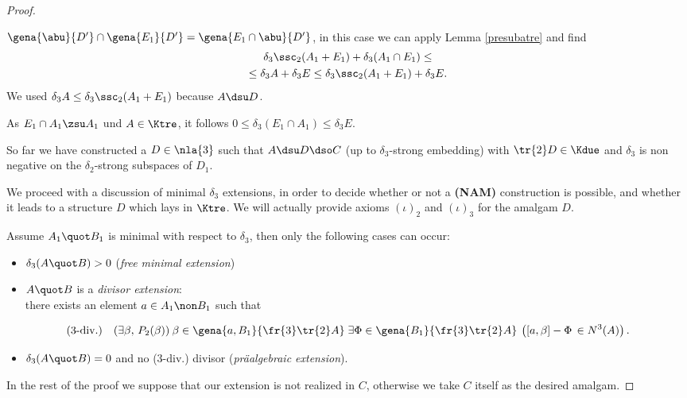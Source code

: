 \begin{proof}
\begin{description}
\smallskip
$\gena{\abu}{D^{\prime}}\cap\gena{E_{1}}{D^{\prime}}=\gena{E_{1}\cap\abu}{D^{\prime}}$,
in this case we can apply Lemma \ref{presubatre} and find
\begin{multline*}
\delta_{3}\ssc_{2}(A_{1}+E_{1})+\delta_{3}(A_{1}\cap E_{1})\leq\\
\leq\delta_{3}A+\delta_{3}E\leq\delta_{3}\ssc_{2}(A_{1}+E_{1})+\delta_{3}E.
\end{multline*}
We used $\delta_{3}A\leq\delta_{3}\ssc_{2}(A_{1}+E_{1})$ because $A\dsu D$.

As $E_{1}\cap A_{1}\zsu A_{1}$ und $A\in\Ktre$, it follows $0\leq\delta_{3}(E_{1}\cap A_{1})\leq\delta_{3}E$.

So far we have constructed a $D\in\nla{3}$ such that $A\dsu D\dso C$ (up to $\delta_{3}$-strong
embedding) with $\tr{2}D\in\Kdue$ and
$\delta_{3}$ is non negative on the $\delta_{2}$-strong subspaces of $D_{1}$.
\end{description}

We proceed with a discussion of minimal $\delta_{3}$ extensions, in order to decide whether or not a {\bf (NAM)}
construction is possible, and whether it leads to a structure $D$ which lays in $\Ktre$.
We will actually provide axioms $(\iota)_{2}$ and $(\iota)_{3}$ for the amalgam $D$.

Assume $A_{1}\quot B_{1}$ is minimal with respect to $\delta_{3}$,
then only the following cases can occur:
\begin{itemize}
\item$\delta_{3}(A\quot B)>0$ (\emph{free minimal extension})
\item%
$A\quot B$ is a \emph{divisor extension}:\\
there exists an element $a\in A_{1}\non B_{1}$ such that\end{itemize}
$$ %
\text{($3$-div.)}\quad
(\exists\beta,\,P_{2}(\beta))\:\beta\in\gena{a,B_{1}}{\fr{3}\tr{2}A}\;\exists\Phi\in\gena{B_{1}}{\fr{3}\tr{2}A}\:\left([a,\beta]-\Phi\,\in N^{3}(A)\right).
$$\begin{itemize}

\item$\delta_{3}(A\quot B)=0$ and no ($3$-div.) divisor (\emph{pr\"{a}algebraic extension}).
\end{itemize}

In the rest of the proof we suppose that our extension is not realized in $C$,
otherwise we take $C$ itself as the desired amalgam.


\end{proof}
